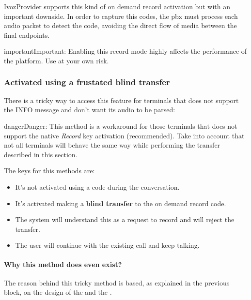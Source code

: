 \documentclass[letterpaper,10pt,english]{sphinxmanual}
\begin{document}
IvozProvider supports this kind of on demand record activation but with an
important downside. In order to capture this codes, the pbx must process each
audio packet to detect the code, avoiding the direct flow of media between the
final endpoints.

\begin{notice}{important}{Important:}
Enabling this record mode highly affects the performance of the
platform. Use at your own risk.
\end{notice}


\subsubsection{Activated using a frustated blind transfer}
\label{company/call_recording:activated-using-a-frustated-blind-transfer}
There is a tricky way to access this feature for terminals that does not support
the INFO message and don't want its audio to be parsed:

\begin{notice}{danger}{Danger:}
This method is a workaround for those terminals that does not support
the native \emph{Record} key activation (recommended). Take into account that not
all terminals will behave the same way while performing the transfer described
in this section.
\end{notice}

The keys for this methods are:
\begin{itemize}
\item {} 
It's not activated using a code during the conversation.

\item {} 
It's activated making a \textbf{blind transfer} to the on demand record code.

\item {} 
The system will understand this as a request to record and will reject the transfer.

\item {} 
The user will continue with the existing call and keep talking.

\end{itemize}
\paragraph{Why this method does even exist?}

The reason behind this tricky method is based, as explained in the previous
block, on the design of the {\hyperref[basics/architecture/index:architecture]{}} and the {\hyperref[basics/architecture/index:audioflow]{}}.
\end{document}
